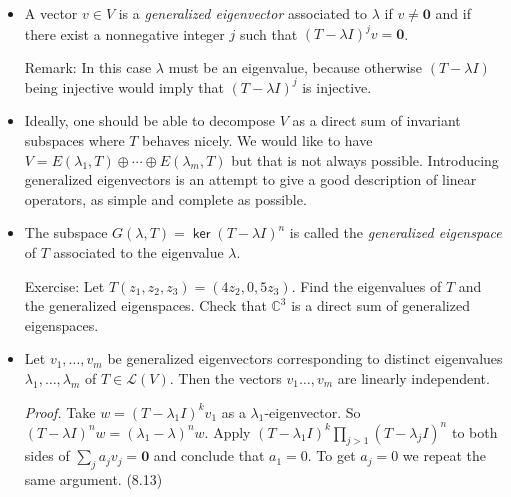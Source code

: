 \documentclass[11pt]{article}
\newcommand{\1}{\mathbf{1}}
\newcommand{\0}{\mathbf{0}}
\newcommand{\C}{\mathbb{C}}
\DeclareMathOperator{\myrange}{\mathsf{range}}
\DeclareMathOperator{\myker}{\mathsf{ker}}
\begin{document}
{\begin{itemize}
We have $V = \myker T^n \oplus \myrange T^n$.

\emph{Proof.}
To show $\myker \cap \myrange = \{\0\}$, write $v = T^n u$, and show $u \in \myker T^{2n} = \myker T^n$.
Finally, dimensions add up by Rank-Nullity Theorem.

After-class exercise:
Let $T(z_1,z_2,z_3)=(4z_2,0,5z_3)$.
Check that $\myker T \cap \myrange T \ne \{\0\}$ and $\C^3 \ne \myker T + \myrange T$ but $\C^3 = \myker T^3 \oplus \myrange T^3$ by finding describing these subspaces explicitly.
\hfill
(8.5)

\item

A vector $v\in V$ is a \emph{generalized eigenvector} associated to $\lambda$ if $v\neq\0$ and if there exist a nonnegative integer $j$ such that $(T-\lambda I)^jv=\0$.

Remark:
In this case $\lambda$ must be an eigenvalue, because otherwise $(T-\lambda I)$ being injective would imply that $(T-\lambda I)^j$ is injective.

\item

Ideally, one should be able to decompose $V$ as a direct sum of invariant subspaces where $T$ behaves nicely.
We would like to have $V = E(\lambda_1, T) \oplus \cdots \oplus E(\lambda_m,T)$ but that is not always possible.
Introducing generalized eigenvectors is an attempt to give a good description of linear operators, as simple and complete as possible.

\item

The subspace $G(\lambda,T) = \myker (T-\lambda I)^n$ is called the \emph{generalized eigenspace} of $T$ associated to the eigenvalue $\lambda$.

Exercise:
Let $T(z_1,z_2,z_3)=(4z_2,0,5z_3)$.
Find the eigenvalues of $T$ and the generalized eigenspaces.
Check that $\C^3$ is a direct sum of generalized eigenspaces.

\item

Let $v_1,\dots,v_m$ be generalized eigenvectors corresponding to distinct eigenvalues $\lambda_1,\dots,\lambda_m$ of $T\in\mathcal{L}(V)$. Then the vectors $v_1\dots,v_m$ are linearly independent.

\emph{Proof.}
Take $w=(T-\lambda_1 I)^k v_1$ as a $\lambda_1$-eigenvector.
So $(T - \lambda I)^n w = (\lambda_1 - \lambda)^n w$.
Apply $(T-\lambda_1 I)^k \prod_{j>1} (T - \lambda_j I)^n$ to both sides of $\sum_j a_j v_j = \0$ and conclude that $a_1 = 0$.
To get $a_j = 0$ we repeat the same argument.
\hfill
(8.13)


\end{itemize}}
\end{document}
